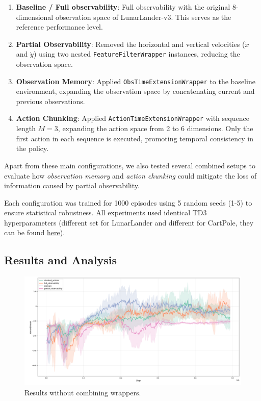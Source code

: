 \documentclass[12pt, a4paper]{article}
\begin{document}
\begin{enumerate}
	\item \textbf{Baseline / Full observability}: Full observability with the original 8-dimensional observation space of LunarLander-v3. This serves as the reference performance level.

	\item \textbf{Partial Observability}: Removed the horizontal and vertical velocities ($\dot{x}$ and $\dot{y}$) using two nested \texttt{FeatureFilterWrapper} instances, reducing the observation space.

	\item \textbf{Observation Memory}: Applied \texttt{ObsTimeExtensionWrapper} to the baseline environment, expanding the observation space by concatenating current and previous observations.

	\item \textbf{Action Chunking}: Applied \texttt{ActionTimeExtensionWrapper} with sequence length $M=3$, expanding the action space from 2 to 6 dimensions. Only the first action in each sequence is executed, promoting temporal consistency in the policy.
	
\end{enumerate}


Apart from these main configurations, we also tested several combined setups to evaluate how \textit{observation memory} and \textit{action chunking} could mitigate the loss of information caused by partial observability.

Each configuration was trained for 1000 episodes using 5 random seeds (1-5) to ensure statistical robustness. All experiments used identical TD3 hyperparameters (different set for LunarLander and different for CartPole, they can be found \href{https://github.com/KrystianPielat/rl-project-2/blob/master/run_experiments.py}{here}).

\subsection{Results and Analysis}

\begin{figure}[H]
	\centering
	\includegraphics[width=1\linewidth]{results_lunar_lander_basic}
	\caption{Results without combining wrappers.}
	\label{fig:resultslunarlanderbasic}
\end{figure}
\end{document}
